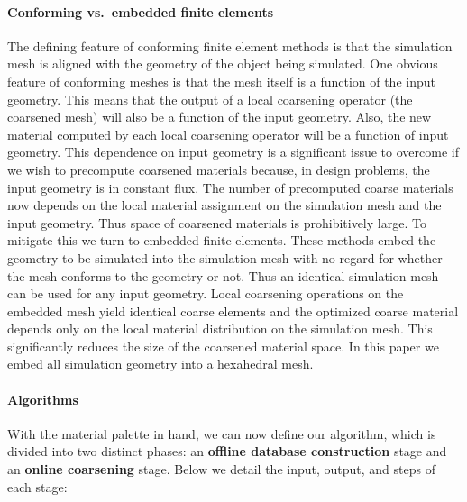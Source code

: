 \paragraph{Conforming vs.~embedded finite elements}
The defining feature of conforming finite element methods is that the simulation mesh is aligned with the geometry of the object being simulated. One obvious feature of conforming meshes is that the mesh itself is a function of the input geometry. This means that the output of a local coarsening operator (the coarsened mesh) will also be a function of the input geometry. Also, the new material computed by each local coarsening operator will be a function of input geometry. This dependence on input geometry is a significant issue to overcome if we wish to precompute coarsened materials because, in design problems, the input geometry is in constant flux. The number of precomputed coarse materials now depends on the local material assignment on the simulation mesh and the input geometry. Thus space of coarsened materials is prohibitively large. 
To mitigate this we turn to embedded finite elements. These methods embed the geometry to be simulated into the simulation mesh with no regard for whether the mesh conforms to the geometry or not. Thus an identical simulation mesh can be used for any input geometry. Local coarsening operations on the embedded mesh yield identical coarse elements and the optimized coarse material depends only on the local material distribution on the simulation mesh.  This significantly reduces the size of the coarsened material space.  In this paper we embed all simulation geometry into a hexahedral mesh.


\paragraph{Algorithms}
With the material palette in hand, we can now define our algorithm, which is divided into two distinct phases: an \textbf{offline database construction} stage and an \textbf{online coarsening} stage.  Below we detail the input, output, and steps of each stage:\\

